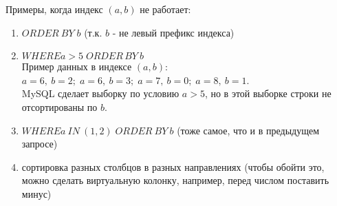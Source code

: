 Примеры, когда индекс $(a, b)$ не работает:
\begin{enumerate}
\item $ORDER\:BY \; b$ (т.к. $b$ - не левый префикс индекса)
\item $WHERE a>5 \; ORDER\,BY\:b$ \\
Пример данных в индексе $(a, b)$: $a=6,\:b=2; \; a=6,\:b=3; \; a=7,\: b=0; \; a=8,\:b=1$.\\
MySQL сделает выборку по условию $a>5$, но в этой выборке строки не отсортированы по $b$.
\item $WHERE a\:IN\:(1,2) \; ORDER\:BY\:b$ (тоже самое, что и в предыдущем запросе)
\item сортировка разных столбцов в разных направлениях (чтобы обойти это, можно сделать виртуальную колонку, например, перед числом поставить минус)
\end{enumerate}